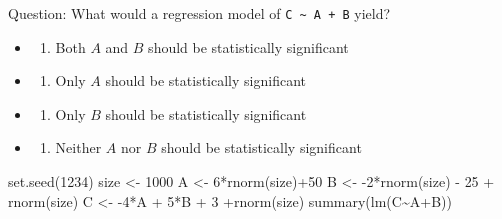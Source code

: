\documentclass[
]{article}
\newenvironment{Shaded}{\begin{snugshade}}{\end{snugshade}}
\newcommand{\DecValTok}[1]{\textcolor[rgb]{0.00,0.00,0.81}{#1}}
\newcommand{\FunctionTok}[1]{\textcolor[rgb]{0.00,0.00,0.00}{#1}}
\newcommand{\NormalTok}[1]{#1}
\newcommand{\OtherTok}[1]{\textcolor[rgb]{0.56,0.35,0.01}{#1}}
\newcommand{\SpecialCharTok}[1]{\textcolor[rgb]{0.00,0.00,0.00}{#1}}
\providecommand{\tightlist}{%
  \setlength{\itemsep}{0pt}\setlength{\parskip}{0pt}}
\begin{document}
Question: What would a regression model of
\texttt{C\ \textasciitilde{}\ A\ +\ B} yield?

\begin{itemize}
\item
  \begin{enumerate}
  \def\labelenumi{\alph{enumi})}
  \tightlist
  \item
    Both \(A\) and \(B\) should be statistically significant
  \end{enumerate}
\item
  \begin{enumerate}
  \def\labelenumi{\alph{enumi})}
  \setcounter{enumi}{1}
  \tightlist
  \item
    Only \(A\) should be statistically significant
  \end{enumerate}
\item
  \begin{enumerate}
  \def\labelenumi{\alph{enumi})}
  \setcounter{enumi}{2}
  \tightlist
  \item
    Only \(B\) should be statistically significant
  \end{enumerate}
\item
  \begin{enumerate}
  \def\labelenumi{\alph{enumi})}
  \setcounter{enumi}{3}
  \tightlist
  \item
    Neither \(A\) nor \(B\) should be statistically significant
  \end{enumerate}
\end{itemize}

\begin{Shaded}
\begin{Highlighting}[]
\FunctionTok{set.seed}\NormalTok{(}\DecValTok{1234}\NormalTok{)}
\NormalTok{size }\OtherTok{\textless{}{-}} \DecValTok{1000}
\NormalTok{A }\OtherTok{\textless{}{-}} \DecValTok{6}\SpecialCharTok{*}\FunctionTok{rnorm}\NormalTok{(size)}\SpecialCharTok{+}\DecValTok{50}
\NormalTok{B }\OtherTok{\textless{}{-}} \SpecialCharTok{{-}}\DecValTok{2}\SpecialCharTok{*}\FunctionTok{rnorm}\NormalTok{(size) }\SpecialCharTok{{-}} \DecValTok{25} \SpecialCharTok{+} \FunctionTok{rnorm}\NormalTok{(size)}
\NormalTok{C }\OtherTok{\textless{}{-}} \SpecialCharTok{{-}}\DecValTok{4}\SpecialCharTok{*}\NormalTok{A }\SpecialCharTok{+} \DecValTok{5}\SpecialCharTok{*}\NormalTok{B }\SpecialCharTok{+} \DecValTok{3} \SpecialCharTok{+}\FunctionTok{rnorm}\NormalTok{(size)}
\FunctionTok{summary}\NormalTok{(}\FunctionTok{lm}\NormalTok{(C}\SpecialCharTok{\textasciitilde{}}\NormalTok{A}\SpecialCharTok{+}\NormalTok{B))}
\end{Highlighting}
\end{Shaded}
\end{document}
